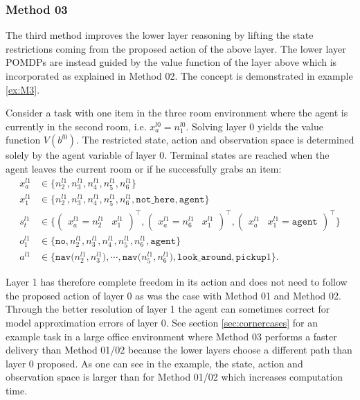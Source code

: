\subsubsection{Method 03}\label{subsec:M3}
The third method improves the lower layer reasoning by lifting the state restrictions coming from the proposed action of the above layer. The lower layer POMDPs are instead guided by the value function of the layer above which is incorporated as explained in Method 02. The concept is demonstrated in example \ref{ex:M3}.

\begin{example}\label{ex:M3}
Consider a task with one item in the three room environment where the agent is currently in the second room, i.e. $x_a^{l0}=n_1^{l0}$. Solving layer 0 yields the value function $V(b^{l0})$. The restricted state, action and observation space is determined solely by the agent variable of layer 0. Terminal states are reached when the agent leaves the current room or if he successfully grabs an item:
\begin{equation}
    \begin{aligned}
        x_a^{l1} &\in \big\{ n_2^{l1}, n_3^{l1}, n_4^{l1}, n_5^{l1}, n_6^{l1} \big\} \\
        x_1^{l1} &\in  \big\{ n_2^{l1}, n_3^{l1}, n_4^{l1}, n_5^{l1}, n_6^{l1}, \texttt{not\_here}, \texttt{agent} \big\}\\
         s_t^{l1} &\in \big\{\begin{pmatrix} x_a^{l1}=n_2^{l1} & x_1^{l1} \end{pmatrix}^\intercal, \begin{pmatrix} x_a^{l1}=n_6^{l1} & x_1^{l1} \end{pmatrix}^\intercal,  \begin{pmatrix} x_a^{l1} & x_1^{l1}=\texttt{agent} \end{pmatrix}^\intercal \big\}\\
        o_1^{l1} &\in \big\{\texttt{no}, n_2^{l1}, n_3^{l1}, n_4^{l1}, n_5^{l1}, n_6^{l1}, \texttt{agent} \big\}\\
        a^{l1} &\in \big\{\texttt{nav($n_2^{l1}, n_3^{l1}$)}, \cdots,  \texttt{nav($n_5^{l1}, n_6^{l1}$)}, \texttt{look\_around}, \texttt{pickup}1 \big\}.
    \end{aligned}
\end{equation}
\demo
\end{example}
Layer 1 has therefore complete freedom in its action and does not need to follow the proposed action of layer 0 as was the case with Method 01 and Method 02. Through the better resolution of layer 1 the agent can sometimes correct for model approximation errors of layer 0. See section \ref{sec:cornercases} for an example task in a large office environment where Method 03 performs a faster delivery than Method 01/02 because the lower layers choose a different path than layer 0 proposed. As one can see in the example, the state, action and observation space is larger than for Method 01/02 which increases computation time.\\

